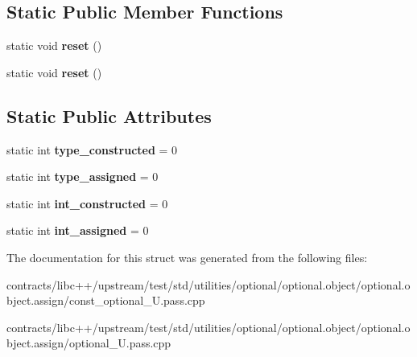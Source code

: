 \subsection*{Static Public Member Functions}
\begin{DoxyCompactItemize}
\item 
\mbox{\label{struct_assignable_from_a0142e557679910fe15eec3ebd1fbec90}} 
static void {\bfseries reset} ()
\item 
\mbox{\label{struct_assignable_from_a0142e557679910fe15eec3ebd1fbec90}} 
static void {\bfseries reset} ()
\end{DoxyCompactItemize}
\subsection*{Static Public Attributes}
\begin{DoxyCompactItemize}
\item 
\mbox{\label{struct_assignable_from_aed6269b368ecbbfbaf84e5a3f3d0f550}} 
static int {\bfseries type\+\_\+constructed} = 0
\item 
\mbox{\label{struct_assignable_from_a19327a87d9c044b71843375ff52a5189}} 
static int {\bfseries type\+\_\+assigned} = 0
\item 
\mbox{\label{struct_assignable_from_aad204cb5fdb2d7ca66b57323802a45a9}} 
static int {\bfseries int\+\_\+constructed} = 0
\item 
\mbox{\label{struct_assignable_from_a2d7c18d5bfd2221bf577b866e03d4d19}} 
static int {\bfseries int\+\_\+assigned} = 0
\end{DoxyCompactItemize}


The documentation for this struct was generated from the following files\+:\begin{DoxyCompactItemize}
\item 
contracts/libc++/upstream/test/std/utilities/optional/optional.\+object/optional.\+object.\+assign/const\+\_\+optional\+\_\+\+U.\+pass.\+cpp\item 
contracts/libc++/upstream/test/std/utilities/optional/optional.\+object/optional.\+object.\+assign/optional\+\_\+\+U.\+pass.\+cpp\end{DoxyCompactItemize}
